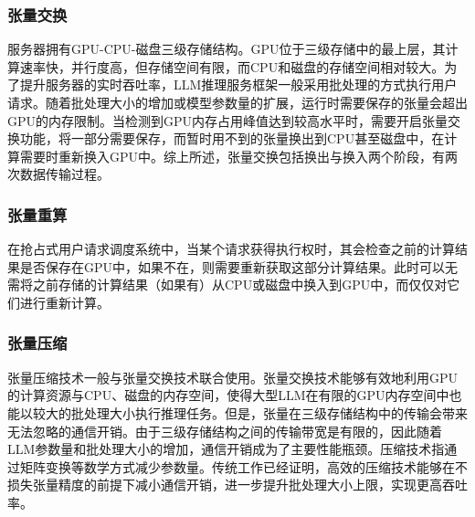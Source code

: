\documentclass[a4paper, nosysfonts]{hpcchina}
\begin{document}
\subsubsection{张量交换}
服务器拥有GPU-CPU-磁盘三级存储结构。GPU位于三级存储中的最上层，其计算速率快，并行度高，但存储空间有限，而CPU和磁盘的存储空间相对较大。为了提升服务器的实时吞吐率，LLM推理服务框架一般采用批处理的方式执行用户请求。随着批处理大小的增加或模型参数量的扩展，运行时需要保存的张量会超出GPU的内存限制。当检测到GPU内存占用峰值达到较高水平时，需要开启张量交换功能，将一部分需要保存，而暂时用不到的张量换出到CPU甚至磁盘中，在计算需要时重新换入GPU中。综上所述，张量交换包括换出与换入两个阶段，有两次数据传输过程。
\subsubsection{张量重算}
在抢占式用户请求调度系统中，当某个请求获得执行权时，其会检查之前的计算结果是否保存在GPU中，如果不在，则需要重新获取这部分计算结果。此时可以无需将之前存储的计算结果（如果有）从CPU或磁盘中换入到GPU中，而仅仅对它们进行重新计算。
\subsubsection{张量压缩}
张量压缩技术一般与张量交换技术联合使用。张量交换技术能够有效地利用GPU的计算资源与CPU、磁盘的内存空间，使得大型LLM在有限的GPU内存空间中也能以较大的批处理大小执行推理任务。但是，张量在三级存储结构中的传输会带来无法忽略的通信开销。由于三级存储结构之间的传输带宽是有限的，因此随着LLM参数量和批处理大小的增加，通信开销成为了主要性能瓶颈。压缩技术指通过矩阵变换等数学方式减少参数量。传统工作已经证明，高效的压缩技术能够在不损失张量精度的前提下减小通信开销，进一步提升批处理大小上限，实现更高吞吐率。
\end{document}
